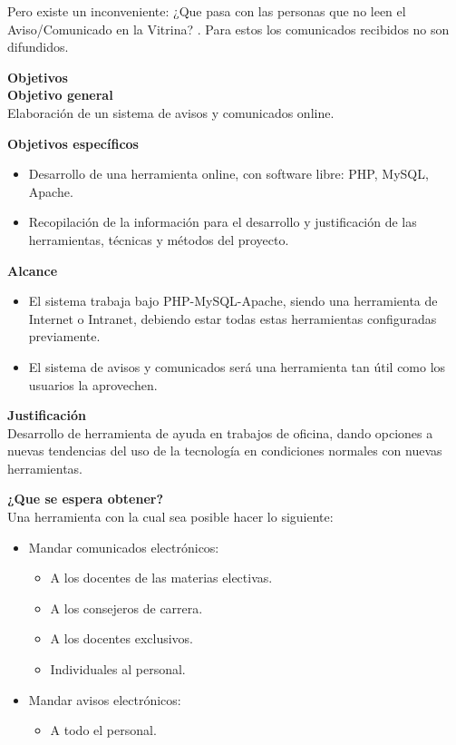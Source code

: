 \documentclass[10pt,letterpaper,twoside]{article}
\newcommand{\btext}[1]{
    \vspace{10mm}
    {{\textcolor{titlecolor}{\large{\textbf{\textsf{#1}}}}}}
    \vspace{5mm}
    \\
}
\newcommand{\ctext}[1]{
    \vspace{5mm}
    {{\textcolor{titlecolor}{\large{\textbf{\textsf{#1}}}}}}
    \\
}
\begin{document}
\begin{multicols}{2}
Pero existe un inconveniente: ¿Que pasa con las personas que no leen el Aviso/Comunicado en la Vitrina? . Para estos los comunicados recibidos no son difundidos.

\btext{Objetivos}

\ctext{Objetivo general}
Elaboración de un sistema de avisos y comunicados online.

\ctext{Objetivos específicos}
\begin{itemize}
    \item Desarrollo de una herramienta online, con software libre: PHP, MySQL, Apache.
    \item Recopilación de la información para el desarrollo y justificación de las herramientas, técnicas y métodos del proyecto.
\end{itemize}

\btext{Alcance}
\begin{itemize}
    \item El sistema trabaja bajo PHP-MySQL-Apache, siendo una herramienta de Internet o Intranet, debiendo estar todas estas herramientas configuradas previamente.
    \item El sistema de avisos y comunicados será una herramienta tan útil como los usuarios la aprovechen.
\end{itemize}

\btext{Justificación}
Desarrollo de herramienta de ayuda en trabajos de oficina, dando opciones a nuevas tendencias del uso de la tecnología en condiciones normales con nuevas herramientas.

\btext{¿Que se espera obtener?}
Una herramienta con la cual sea posible hacer lo siguiente:
\begin{itemize}
    \item Mandar comunicados electrónicos:
    \begin{itemize}
        \item A los docentes de las materias electivas.
        \item A los consejeros de carrera.
        \item A los docentes exclusivos.
        \item Individuales al personal.
    \end{itemize}
    \item Mandar avisos electrónicos:
    \begin{itemize}
        \item A todo el personal.
    \end{itemize}
\end{itemize}


\end{multicols}
\end{document}
